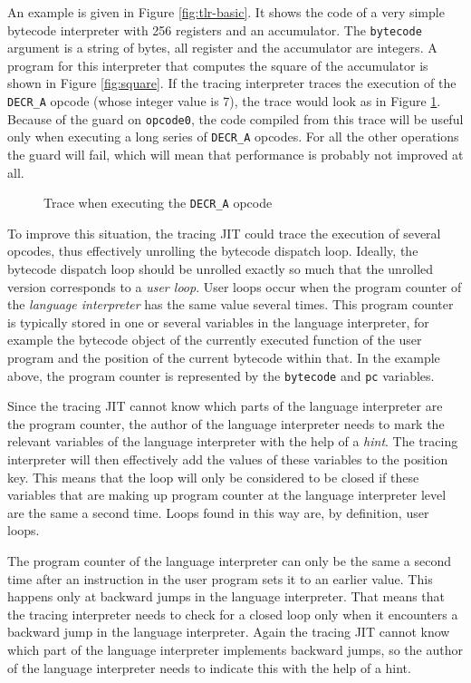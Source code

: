 \documentclass{sig-alternate}
\begin{document}
An example is given in Figure \ref{fig:tlr-basic}. It shows the code of a very
simple bytecode interpreter with 256 registers and an accumulator. The
\texttt{bytecode} argument is a string of bytes, all register and the
accumulator are integers. A program for this interpreter that computes
the square of the accumulator is shown in Figure \ref{fig:square}. If the
tracing interpreter traces the execution of the \texttt{DECR\_A} opcode (whose
integer value is 7), the trace would look as in Figure \ref{fig:trace-normal}.
Because of the guard on \texttt{opcode0}, the code compiled from this trace will
be useful only when executing a long series of \texttt{DECR\_A} opcodes. For all
the other operations the guard will fail, which will mean that performance is
probably not improved at all.

\begin{figure}

\caption{Trace when executing the \texttt{DECR\_A} opcode}
\label{fig:trace-normal}
\end{figure}

To improve this situation, the tracing JIT could trace the execution of several
opcodes, thus effectively unrolling the bytecode dispatch loop. Ideally, the
bytecode dispatch loop should be unrolled exactly so much that the unrolled version
corresponds to a \emph{user loop}. User loops
occur when the program counter of the \emph{language interpreter} has the
same value several times. This program counter is typically stored in one or several
variables in the language interpreter, for example the bytecode object of the
currently executed function of the user program and the position of the current
bytecode within that.  In the example above, the program counter is represented by 
the \texttt{bytecode} and \texttt{pc} variables.

Since the tracing JIT cannot know which parts of the language interpreter are
the program counter, the author of the language interpreter needs to mark the
relevant variables of the language interpreter with the help of a \emph{hint}.
The tracing interpreter will then effectively add the values of these variables
to the position key. This means that the loop will only be considered to be
closed if these variables that are making up program counter at the language
interpreter level are the same a second time.  Loops found in this way are, by
definition, user loops.

The program counter of the language interpreter can only be the same a
second time after an instruction in the user program sets it to an earlier
value. This happens only at backward jumps in the language interpreter. That
means that the tracing interpreter needs to check for a closed loop only when it
encounters a backward jump in the language interpreter. Again the tracing JIT
cannot know which part of the language interpreter implements backward jumps,
so the author of the language interpreter needs to indicate this with the help
of a hint.
\end{document}
